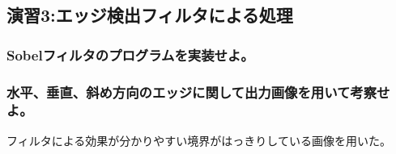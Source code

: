 ﻿\documentclass[a4j,11pt]{jarticle}
\begin{document}
\subsection{演習3:エッジ検出フィルタによる処理}

\subsubsection{Sobelフィルタのプログラムを実装せよ。}
\subsubsection{水平、垂直、斜め方向のエッジに関して出力画像を用いて考察せよ。}
フィルタによる効果が分かりやすい境界がはっきりしている画像を用いた。
\clearpage
\begin{figure}[tb]


\end{figure}
\end{document}
